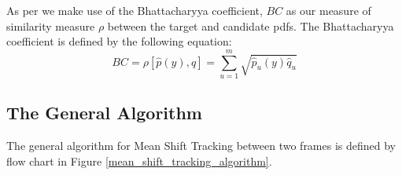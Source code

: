 As per \cite{Comaniciu2003} we make use of the Bhattacharyya coefficient, $BC$ as our
measure of similarity measure $\rho$ between the target and candidate pdfs. The
Bhattacharyya coefficient is defined by the following equation:
\begin{equation}
    BC = \rho[\hat{p}(y),\hat{q}]=\sum_{u=1}^{m}\sqrt{\hat{p}_u(y)\hat{q}_u}
\end{equation}

\subsection{The General Algorithm}
The general algorithm for Mean Shift Tracking between two frames is defined by
flow chart in Figure \ref{mean_shift_tracking_algorithm}. 





